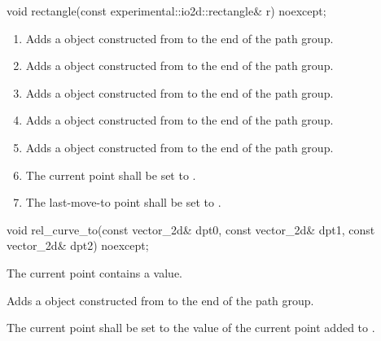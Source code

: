 \begin{itemdecl}
    void rectangle(const experimental::io2d::rectangle& r) noexcept;
\end{itemdecl}
\begin{itemdescr}
	\pnum
	\effects
	\begin{enumerate}
	\item Adds a  object constructed from  to the end of the path group.
	
	\item Adds a  object constructed from  to the end of the path group.
	
	\item Adds a  object constructed from  to the end of the path group.
	
	\item Adds a  object constructed from  to the end of the path group.
	
	\item Adds a  object constructed from  to the end of the path group.
	
	\item The current point shall be set to .
	
	\item The last-move-to point shall be set to .
	\end{enumerate}
\end{itemdescr}

\begin{itemdecl}
    void rel_curve_to(const vector_2d& dpt0, const vector_2d& dpt1,
      const vector_2d& dpt2) noexcept;
\end{itemdecl}
\begin{itemdescr}
	\pnum
	\requires
	The current point contains a value.
	
	\pnum
	\effects
	Adds a  object constructed from  to the end of the path group.
	
	\pnum
	The current point shall be set to the value of the current point added to .
\end{itemdescr}

